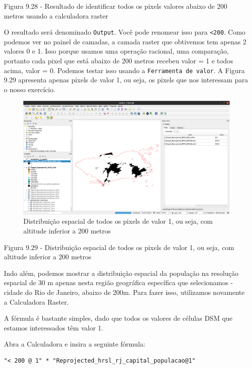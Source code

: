 \documentclass[
  portuguese,
]{krantz}
\begin{document}
Figura 9.28 - Resultado de identificar todos os pixels valores abaixo de 200 metros usando a calculadora raster

O resultado será denominado \texttt{Output}. Você pode renomear isso para \texttt{\textless{}200}. Como podemos ver no painel de camadas, a camada raster que obtivemos tem apenas 2 valores 0 e 1. Isso porque usamos uma operação racional, uma comparação, portanto cada pixel que está abaixo de 200 metros recebeu valor = 1 e todos acima, valor = 0. Podemos testar isso usando a \texttt{Ferramenta\ de\ valor}. A Figura 9.29 apresenta apenas pixels de valor 1, ou seja, os pixels que nos interessam para o nosso exercício.

\begin{figure}
\centering
\includegraphics{media/modulo9/fig929.png}
\caption{Distribuição espacial de todos os pixels de valor 1, ou seja, com altitude inferior a 200 metros}
\end{figure}

Figura 9.29 - Distribuição espacial de todos os pixels de valor 1, ou seja, com altitude inferior a 200 metros

Indo além, podemos mostrar a distribuição espacial da população na resolução espacial de 30 m apenas nesta região geográfica específica que selecionamos - cidade do Rio de Janeiro, abaixo de 200m. Para fazer isso, utilizamos novamente a Calculadora Raster.

A fórmula é bastante simples, dado que todos os valores de células DSM que estamos interessados \hspace{0pt}\hspace{0pt}têm valor 1.

Abra a Calculadora e insira a seguinte fórmula:

\begin{verbatim}
"< 200 @ 1" * "Reprojected_hrsl_rj_capital_populacao@1"
\end{verbatim}
\end{document}
